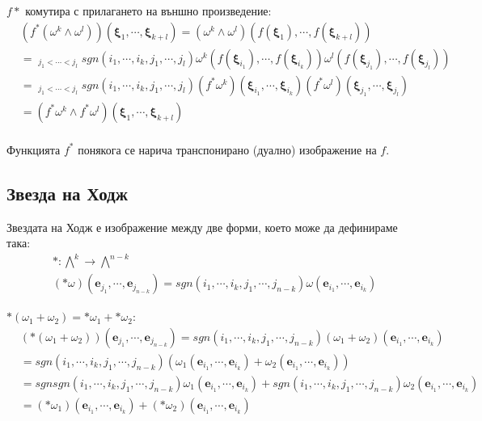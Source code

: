 \documentclass[12pt]{article}
\newcommand\func[3]{#1:#2 \to #3}
\newcommand\myxi[0]{\boldsymbol{\xi}}
\begin{document}
\begin{large}
 $f*$ комутира с прилагането на външно произведение:
\begin{align*}
&(f^*(\omega^k \wedge \omega^l))(\myxi_1,\cdots,\myxi_{k+l})=(\omega^k \wedge \omega^l)(f(\myxi_1),\cdots,f(\myxi_{k+l})) \\
&=\mathop{\sum_{i_1<\cdots<i_k}}_{j_1<\cdots<j_l}sgn(i_1,\cdots,i_k,j_1, \cdots,j_l) \omega^k(f(\myxi_{i_1}),\cdots,f(\myxi_{i_k})) \omega^l(f(\myxi_{j_1}),\cdots,f(\myxi_{j_l})) \\
&=\mathop{\sum_{i_1<\cdots<i_k}}_{j_1<\cdots<j_l}sgn(i_1,\cdots,i_k,j_1, \cdots,j_l) (f^* \omega^k)(\myxi_{i_1},\cdots,\myxi_{i_k}) (f^*\omega^l)(\myxi_{j_1},\cdots,\myxi_{j_l}) \\
&=(f^* \omega^k \wedge f^*\omega^l)(\myxi_1,\cdots, \myxi_{k+l})\\
\end{align*}

\begin{comment}
&(\lambda (f^* \omega^k))(\myxi_1,\cdots,\myxi_k)=(\lambda \omega^k)(f(\myxi_1),\cdots, f(\myxi_k))=
\lambda (f^* \omega^k)(\myxi_1,\cdots,\myxi_k)
\end{comment}

Функцията $f^*$ понякога се нарича транспонирано (дуално) изображение на $f$.

\subsection{Звезда на Ходж}
Звездата на Ходж е изображение между две форми, което може да дефинираме така:
\begin{align*}
&\func{\ast}{{\bigwedge}^k}{{\bigwedge}^{n-k}} \\
&(\ast \omega) (\mathbf{e}_{j_1},\cdots, \mathbf{e}_{j_{n-k}})=sgn(i_1,\cdots,i_k,j_1,\cdots,j_{n-k})\omega(\mathbf{e}_{i_1},\cdots,\mathbf{e}_{i_k})
\end{align*}

$\ast (\omega_1+\omega_2) = \ast\omega_1+ \ast \omega_2$:
\begin{align*}
&(\ast (\omega_1+\omega_2))(\mathbf{e}_{j_1},\cdots, \mathbf{e}_{j_{n-k}})=sgn(i_1,\cdots,i_k,j_1,\cdots,j_{n-k})(\omega_1+\omega_2)(\mathbf{e}_{i_1},\cdots,\mathbf{e}_{i_k}) \\
&=sgn(i_1,\cdots,i_k,j_1,\cdots,j_{n-k})(\omega_1(\mathbf{e}_{i_1},\cdots,\mathbf{e}_{i_k})+\omega_2(\mathbf{e}_{i_1},\cdots,\mathbf{e}_{i_k})) \\
&=sgnsgn(i_1,\cdots,i_k,j_1,\cdots,j_{n-k})\omega_1(\mathbf{e}_{i_1},\cdots,\mathbf{e}_{i_k}) + sgn(i_1,\cdots,i_k,j_1,\cdots,j_{n-k})\omega_2(\mathbf{e}_{i_1},\cdots,\mathbf{e}_{i_k}) \\
&=(\ast\omega_1)(\mathbf{e}_{i_1},\cdots,\mathbf{e}_{i_k})+(\ast\omega_2)(\mathbf{e}_{i_1},\cdots,\mathbf{e}_{i_k})
\end{align*}


\end{large}
\end{document}
